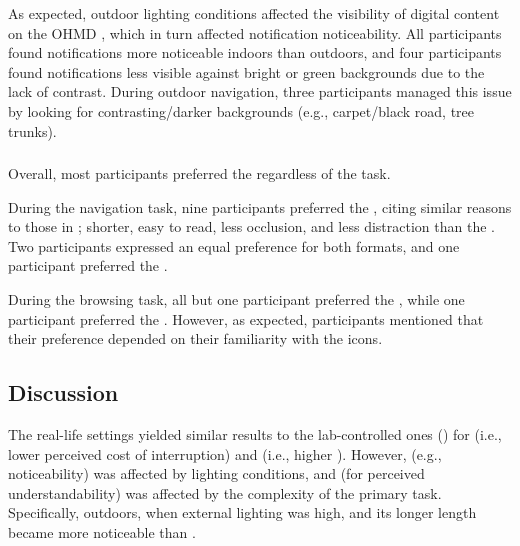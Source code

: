 As expected, outdoor lighting conditions affected the visibility of digital content on the OHMD \cite{erickson_exploring_2020, janaka_visual_2022, gabbard_effects_2006, debernardis_text_2014}, which in turn affected notification noticeability. All participants found notifications more noticeable indoors than outdoors, and four participants found notifications less visible against bright or green backgrounds due to the lack of contrast. During outdoor navigation, three participants managed this issue by looking for contrasting/darker backgrounds (e.g., carpet/black road, tree trunks).

\subsubsection*{\Satisfaction{}}
\label{sec:IconNotif:study4:satisfaction_parameter}

Overall, most participants preferred the \iconformat{} regardless of the task. 

During the navigation task, nine participants preferred the \iconformat{}, citing similar reasons to those in \studythree{}; shorter, easy to read, less occlusion, and less distraction than the \textformat{}. Two participants expressed an equal preference for both formats, and one participant preferred the \textformat{}.

During the browsing task, all but one participant preferred the \iconformat{}, while one participant preferred the \textformat{}. However, as expected, participants mentioned that their preference depended on their familiarity with the icons.






\subsection{Discussion}
\label{sec:IconNotif:study4:discussion}

The real-life settings yielded similar results to the lab-controlled ones () for \Interruption{} (i.e., lower perceived cost of interruption) and \Comprehension{} (i.e., higher \immediateRecall{}). However, \Reaction{} (e.g., noticeability) was affected by lighting conditions, and \Comprehension{} (for perceived understandability) was affected by the complexity of the primary task. Specifically, outdoors, when external lighting was high, \textformat{} and its longer length became more noticeable than \iconformat{}.

